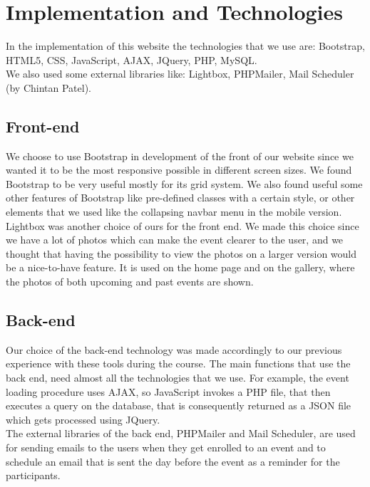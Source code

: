 \documentclass[a4paper]{article}
\begin{document}
	\section{Implementation and Technologies}	
	In the implementation of this website the technologies that we use are: Bootstrap, HTML5, CSS, JavaScript, AJAX, JQuery, PHP, MySQL.\\
	We also used some external libraries like: Lightbox, PHPMailer, Mail Scheduler (by Chintan Patel).
	\subsection{Front-end}
	We choose to use Bootstrap in development of the front of our website since we wanted it to be the most responsive possible in different screen sizes. We found Bootstrap to be very useful mostly for its grid system. We also found useful some other features of Bootstrap like pre-defined classes with a certain style, or other elements that we used like the collapsing navbar menu in the mobile version.\\
	Lightbox was another choice of ours for the front end. We made this choice since we have a lot of photos which can make the event clearer to the user, and we thought that having the possibility to view the photos on a larger version would be a nice-to-have feature. It is used on the home page and on the gallery, where the photos of both upcoming and past events are shown.\\
	\subsection{Back-end}
	Our choice of the back-end technology was made accordingly to our previous experience with these tools during the course. The main functions that use the back end, need almost all the technologies that we use. For example, the event loading procedure uses AJAX, so JavaScript invokes a PHP file, that then executes a query on the database, that is consequently returned as a JSON file which gets processed using JQuery.\\
	The external libraries of the back end, PHPMailer and Mail Scheduler, are used for sending emails to the users when they get enrolled to an event and to schedule an email that is sent the day before the event as a reminder for the participants.
\end{document}
